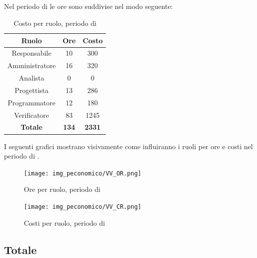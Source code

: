 \subsection{\VV}
Nel periodo di \VV{} le ore sono suddivise nel modo seguente:
\begin{table}[H]
	\centering
	\begin{tabular}{|c|c|c|}
		\hline
		\textbf{Ruolo} &
		\textbf{Ore} &
		\textbf{Costo} \\
		\hline
		Responsabile & 10 & 300\\
		\hline
		Amministratore & 16 & 320\\
		\hline
		Analista & 0 & 0\\
		\hline
		Progettista & 13 & 286 \\
		\hline
		Programmatore & 12 & 180 \\
		\hline
		Verificatore & 83 & 1245\\
		\hline
		\textbf{Totale} & \textbf{134} & \textbf{2331} \\
		\hline
	\end{tabular}
	\caption{Costo per ruolo, periodo di \VV}
\end{table}

I seguenti grafici mostrano visivamente come influiranno i ruoli per ore e costi nel periodo di \VV{}.
\begin{figure}[H]
	\centering
	\texttt{[image: img\_peconomico/VV\_OR.png]}
	\caption{Ore per ruolo, periodo di \VV}
\end{figure}
\begin{figure}[H]
	\centering
	\texttt{[image: img\_peconomico/VV\_CR.png]}
	\caption{Costi per ruolo, periodo di \VV}
\end{figure}

\subsection{Totale}

